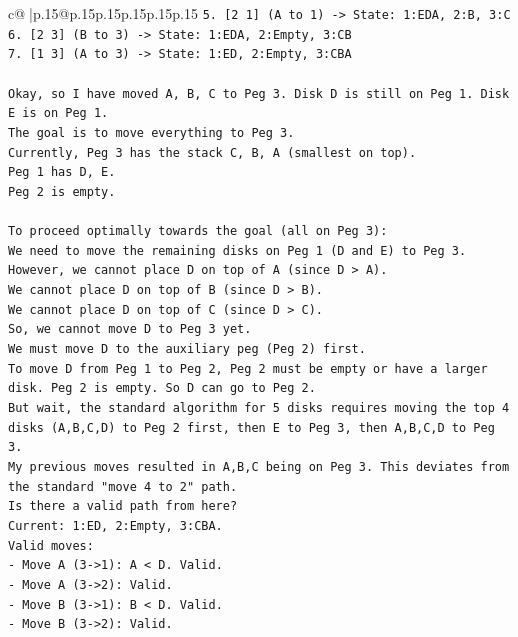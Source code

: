 \documentclass{article}
\begin{document}
{\begin{supertabular}{c@{$\;$}|p{.15\linewidth}@{}p{.15\linewidth}p{.15\linewidth}p{.15\linewidth}p{.15\linewidth}p{.15\linewidth}}
{{{\texttt{5. {[}2 1{]} (A to 1) {-}> State: 1:EDA, 2:B, 3:C} \\
\texttt{6. {[}2 3{]} (B to 3) {-}> State: 1:EDA, 2:Empty, 3:CB} \\
\texttt{7. {[}1 3{]} (A to 3) {-}> State: 1:ED, 2:Empty, 3:CBA} \\
\\ 
\texttt{Okay, so I have moved A, B, C to Peg 3. Disk D is still on Peg 1. Disk E is on Peg 1.} \\
\texttt{The goal is to move everything to Peg 3.} \\
\texttt{Currently, Peg 3 has the stack C, B, A (smallest on top).} \\
\texttt{Peg 1 has D, E.} \\
\texttt{Peg 2 is empty.} \\
\\ 
\texttt{To proceed optimally towards the goal (all on Peg 3):} \\
\texttt{We need to move the remaining disks on Peg 1 (D and E) to Peg 3.} \\
\texttt{However, we cannot place D on top of A (since D > A).} \\
\texttt{We cannot place D on top of B (since D > B).} \\
\texttt{We cannot place D on top of C (since D > C).} \\
\texttt{So, we cannot move D to Peg 3 yet.} \\
\texttt{We must move D to the auxiliary peg (Peg 2) first.} \\
\texttt{To move D from Peg 1 to Peg 2, Peg 2 must be empty or have a larger disk. Peg 2 is empty. So D can go to Peg 2.} \\
\texttt{But wait, the standard algorithm for 5 disks requires moving the top 4 disks (A,B,C,D) to Peg 2 first, then E to Peg 3, then A,B,C,D to Peg 3.} \\
\texttt{My previous moves resulted in A,B,C being on Peg 3. This deviates from the standard "move 4 to 2" path.} \\
\texttt{Is there a valid path from here?} \\
\texttt{Current: 1:ED, 2:Empty, 3:CBA.} \\
\texttt{Valid moves:} \\
\texttt{{-} Move A (3{-}>1): A < D. Valid.} \\
\texttt{{-} Move A (3{-}>2): Valid.} \\
\texttt{{-} Move B (3{-}>1): B < D. Valid.} \\
\texttt{{-} Move B (3{-}>2): Valid.} \\
}}}
\end{supertabular}}
\end{document}
